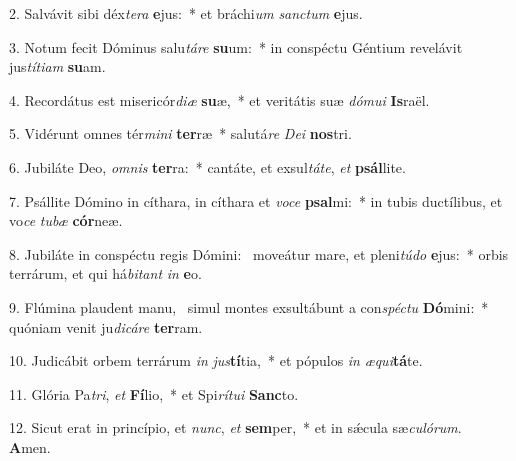 2. Salvávit sibi déx\textit{te}\textit{ra} \textbf{e}jus:~*  et bráchi\textit{um} \textit{sanc}\textit{tum} \textbf{e}jus.\

3. Notum fecit Dóminus salu\textit{tá}\textit{re} \textbf{su}um:~*  in conspéctu Géntium revelávit jus\textit{tí}\textit{ti}\textit{am} \textbf{su}am.\

4. Recordátus est misericór\textit{di}\textit{æ} \textbf{su}æ,~*  et veritátis suæ \textit{dó}\textit{mu}\textit{i} \textbf{Is}raël.\

5. Vidérunt omnes tér\textit{mi}\textit{ni} \textbf{ter}ræ~*  salutá\textit{re} \textit{De}\textit{i} \textbf{nos}tri.\

6. Jubiláte Deo, \textit{om}\textit{nis} \textbf{ter}ra:~*  cantáte, et exsul\textit{tá}\textit{te}, \textit{et} \textbf{psál}lite.\

7. Psállite Dómino in cíthara, in cíthara et \textit{vo}\textit{ce} \textbf{psal}mi:~*  in tubis ductílibus, et vo\textit{ce} \textit{tu}\textit{bæ} \textbf{cór}neæ.\

8. Jubiláte in conspéctu regis Dómini: \dag\  moveátur mare, et pleni\textit{tú}\textit{do} \textbf{e}jus:~*  orbis terrárum, et qui há\textit{bi}\textit{tant} \textit{in} \textbf{e}o.\

9. Flúmina plaudent manu, \dag\  simul montes exsultábunt a con\textit{spéc}\textit{tu} \textbf{Dó}mini:~*  quóniam venit ju\textit{di}\textit{cá}\textit{re} \textbf{ter}ram.\

10. Judicábit orbem terrárum \textit{in} \textit{jus}\textbf{tí}tia,~*  et pópulos \textit{in} \textit{æ}\textit{qui}\textbf{tá}te.\

11. Glória Pa\textit{tri}, \textit{et} \textbf{Fí}lio,~*  et Spi\textit{rí}\textit{tu}\textit{i} \textbf{Sanc}to.\

12. Sicut erat in princípio, et \textit{nunc}, \textit{et} \textbf{sem}per,~*  et in sǽcula sæ\textit{cu}\textit{ló}\textit{rum}. \textbf{A}men.\

